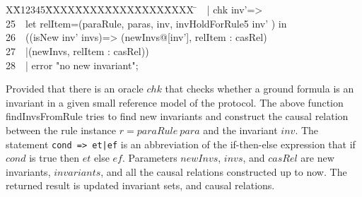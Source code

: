 \documentclass{llncs}
\newlength{\fminilength}
\newenvironment{fmini}[1][\linewidth]
  {\setlength{\fminilength}{#1\fboxsep-2\fboxrule}%
   \vspace{2ex}\noindent\begin{lrbox}{\fminibox}\begin{minipage}{\fminilength}%
   \mbox{ }\hfill\vspace{-2.5ex}}%
  {\end{minipage}\end{lrbox}\vspace{1ex}\hspace{0ex}%
   \framebox{\usebox{\fminibox}}}
\newenvironment{specification}
{\noindent\scriptsize \tt\begin{fmini}\begin{tabbing}X\=X12345\=XXXX\=XXXX\=XXXX\=XXXX\=XXXX
\=\+\kill} {\end{tabbing}\normalfont\end{fmini}}
\def \twoSpaces {\ \ }
\begin{document}
\begin{specification}
24\twoSpaces   | chk inv'=>\\
25\twoSpaces      let relItem=(paraRule, paras, inv,  invHoldForRule5 inv'  ) in\\
26\twoSpaces        ((isNew inv' invs)=>        (newInvs@[inv'], relItem : casRel)\\
27\twoSpaces        |(newInvs,  relItem : casRel))\\
28\twoSpaces   | error "no new invariant";\\
\end{specification}

Provided that there is an oracle $chk$ that checks whether a ground
formula is an invariant in a given small reference model of the
protocol.   The above function {\sf findInvsFromRule} tries to find
new invariants and construct the causal relation between the rule
instance $r=paraRule~ para$ and
 the invariant $inv$. The statement { \tt cond => et|ef} is an abbreviation of the if-then-else expression that if $cond$ is true then $et$ else $ef$. Parameters  $newInvs$, $invs$, and  $casRel$ are new invariants,  $invariants$, and all the causal relations constructed up to now. The returned result is updated invariant sets, and causal relations.
\end{document}

